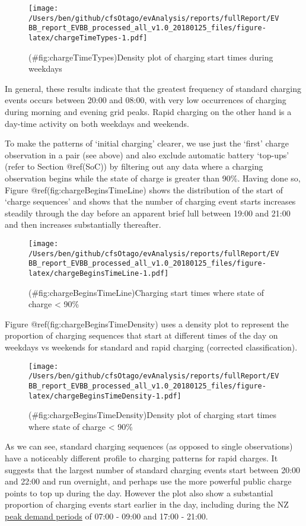 \documentclass[]{article}
\begin{document}
\begin{figure}
\centering
\texttt{[image: /Users/ben/github/cfsOtago/evAnalysis/reports/fullReport/EVBB\_report\_EVBB\_processed\_all\_v1.0\_20180125\_files/figure-latex/chargeTimeTypes-1.pdf]}
\caption{(\#fig:chargeTimeTypes)Density plot of charging start times during weekdays}
\end{figure}

In general, these results indicate that the greatest frequency of standard charging events occurs between 20:00 and 08:00, with very low occurrences of charging during morning and evening grid peaks. Rapid charging on the other hand is a day-time activity on both weekdays and weekends.

To make the patterns of `initial charging' clearer, we use just the `first' charge observation in a pair (see above) and also exclude automatic battery `top-ups' (refer to Section @ref(SoC)) by filtering out any data where a charging observation begins while the state of charge is greater than 90\%. Having done so, Figure @ref(fig:chargeBeginsTimeLine) shows the distribution of the start of `charge sequences' and shows that the number of charging event starts increases steadily through the day before an apparent brief lull between 19:00 and 21:00 and then increases substantially thereafter.

\begin{figure}
\centering
\texttt{[image: /Users/ben/github/cfsOtago/evAnalysis/reports/fullReport/EVBB\_report\_EVBB\_processed\_all\_v1.0\_20180125\_files/figure-latex/chargeBeginsTimeLine-1.pdf]}
\caption{(\#fig:chargeBeginsTimeLine)Charging start times where state of charge \textless{} 90\%}
\end{figure}

Figure @ref(fig:chargeBeginsTimeDensity) uses a density plot to represent the proportion of charging sequences that start at different times of the day on weekdays vs weekends for standard and rapid charging (corrected classification).

\begin{figure}
\centering
\texttt{[image: /Users/ben/github/cfsOtago/evAnalysis/reports/fullReport/EVBB\_report\_EVBB\_processed\_all\_v1.0\_20180125\_files/figure-latex/chargeBeginsTimeDensity-1.pdf]}
\caption{(\#fig:chargeBeginsTimeDensity)Density plot of charging start times where state of charge \textless{} 90\%}
\end{figure}

As we can see, standard charging sequences (as opposed to single observations) have a noticeably different profile to charging patterns for rapid charges. It suggests that the largest number of standard charging events start between 20:00 and 22:00 and run overnight, and perhaps use the more powerful public charge points to top up during the day. However the plot also show a substantial proportion of charging events start earlier in the day, including during the NZ \href{https://www.electrickiwi.co.nz/hour-of-power}{peak demand periods} of 07:00 - 09:00 and 17:00 - 21:00.
\end{document}

